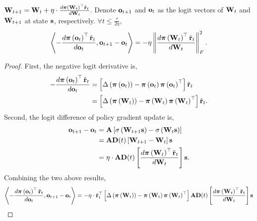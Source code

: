 \begin{lem}
\label{lem:inner_product_logit_difference_logit_derivative}
    ${\mathbf{W}}_{t+1} = {\mathbf{W}}_t + \eta \cdot \frac{d {\boldsymbol{\pi}}\left({\mathbf{W}}_t\right)^\top \hat{{\mathbf{r}}}_t}{d {\mathbf{W}}_t}$. Denote ${\mathbf{o}}_{t+1}$ and ${\mathbf{o}}_t$ as the logit vectors of ${\mathbf{W}}_t$ and ${\mathbf{W}}_{t+1}$ at state ${\mathbf{s}}$, respectively. $\forall t \le \frac{\tau}{ 2 \eta }$,
\begin{equation*}
\begin{split}
    \left\langle - \frac{d {\boldsymbol{\pi}}\left( {\mathbf{o}}_t \right)^\top \hat{{\mathbf{r}}}_t}{d {\mathbf{o}}_t}, {\mathbf{o}}_{t+1} - {\mathbf{o}}_t \right\rangle = - \eta \left\| \frac{d {\boldsymbol{\pi}}\left({\mathbf{W}}_t\right)^\top \hat{{\mathbf{r}}}_t}{d {\mathbf{W}}_t} \right\|_F^2.
\end{split}
\end{equation*}
\end{lem}
\begin{proof}
    First, the negative logit derivative is,
\begin{equation*}
\begin{split}
    - \frac{d {\boldsymbol{\pi}}\left( {\mathbf{o}}_t \right)^\top \hat{{\mathbf{r}}}_t}{d {\mathbf{o}}_t} &= \left[\Delta\left( {\boldsymbol{\pi}}\left( {\mathbf{o}}_t \right) \right) - {\boldsymbol{\pi}}\left( {\mathbf{o}}_t \right) {\boldsymbol{\pi}}\left( {\mathbf{o}}_t \right)^\top \right] \hat{{\mathbf{r}}}_t \\
    &= \left[\Delta\left( {\boldsymbol{\pi}}\left( {\mathbf{W}}_t \right) \right) - {\boldsymbol{\pi}}\left( {\mathbf{W}}_t \right) {\boldsymbol{\pi}}\left( {\mathbf{W}}_t \right)^\top \right] \hat{{\mathbf{r}}}_t.
\end{split}
\end{equation*}
Second, the logit difference of policy gradient update is,
\begin{equation*}
\begin{split}
    {\mathbf{o}}_{t+1} - {\mathbf{o}}_t &= {\mathbf{A}} \left[ \sigma\left({\mathbf{W}}_{t+1} {\mathbf{s}} \right) - \sigma\left( {\mathbf{W}}_t {\mathbf{s}} \right)\right] \\
    &= {\mathbf{A}} {\mathbf{D}}(t) \left[ {\mathbf{W}}_{t+1} - {\mathbf{W}}_t \right] {\mathbf{s}} \\
    &= \eta \cdot {\mathbf{A}} {\mathbf{D}}(t) \left[ \frac{d {\boldsymbol{\pi}}\left({\mathbf{W}}_t\right)^\top \hat{{\mathbf{r}}}_t}{d {\mathbf{W}}_t} \right] {\mathbf{s}}.
\end{split}
\end{equation*}
Combining the two above results,
\begin{equation*}
\begin{split}
    \left\langle - \frac{d \rvpi\left( \rvo_t \right)^\top \hat{\rvr}_t}{d \rvo_t}, \rvo_{t+1} - \rvo_t \right\rangle &= - \eta \cdot \hat{\rvr}_t^\top \left[\Delta\left( \rvpi\left( \rmW_t \right) \right) - \rvpi\left( \rmW_t \right) \rvpi\left( \rmW_t \right)^\top \right] \rmA \rmD(t) \left[ \frac{d \rvpi\left(\rmW_t\right)^\top \hat{\rvr}_t}{d \rmW_t} \right] \rvs \\

\end{split}
\end{equation*}
\end{proof}
